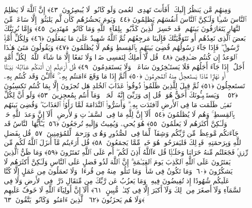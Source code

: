  وَمِنهُم مَّن يَنظُرُ إِلَيكَ ۚ أَفَأَنتَ تَهدِى ٱلعُمىَ وَلَو كَانُوا۟ لَا يُبصِرُونَ ﴿٤٣﴾
 إِنَّ ٱللَّهَ لَا يَظلِمُ ٱلنَّاسَ شَيـًۭٔا وَلَـٰكِنَّ ٱلنَّاسَ أَنفُسَهُم يَظلِمُونَ ﴿٤٤﴾
 وَيَومَ يَحشُرُهُم كَأَن لَّم يَلبَثُوٓا۟ إِلَّا سَاعَةًۭ مِّنَ ٱلنَّهَارِ يَتَعَارَفُونَ بَينَهُم ۚ قَد خَسِرَ ٱلَّذِينَ كَذَّبُوا۟ بِلِقَآءِ ٱللَّهِ وَمَا كَانُوا۟ مُهتَدِينَ ﴿٤٥﴾
 وَإِمَّا نُرِيَنَّكَ بَعضَ ٱلَّذِى نَعِدُهُم أَو نَتَوَفَّيَنَّكَ فَإِلَينَا مَرجِعُهُم ثُمَّ ٱللَّهُ شَهِيدٌ عَلَىٰ مَا يَفعَلُونَ ﴿٤٦﴾
 وَلِكُلِّ أُمَّةٍۢ رَّسُولٌۭ ۖ فَإِذَا جَآءَ رَسُولُهُم قُضِىَ بَينَهُم بِٱلقِسطِ وَهُم لَا يُظلَمُونَ ﴿٤٧﴾
 وَيَقُولُونَ مَتَىٰ هَـٰذَا ٱلوَعدُ إِن كُنتُم صَـٰدِقِينَ ﴿٤٨﴾
 قُل لَّآ أَملِكُ لِنَفسِى ضَرًّۭا وَلَا نَفعًا إِلَّا مَا شَآءَ ٱللَّهُ ۗ لِكُلِّ أُمَّةٍ أَجَلٌ ۚ إِذَا جَآءَ أَجَلُهُم فَلَا يَستَـٔخِرُونَ سَاعَةًۭ ۖ وَلَا يَستَقدِمُونَ ﴿٤٩﴾
 قُل أَرَءَيتُم إِن أَتَىٰكُم عَذَابُهُۥ بَيَـٰتًا أَو نَهَارًۭا مَّاذَا يَستَعجِلُ مِنهُ ٱلمُجرِمُونَ ﴿٥٠﴾
 أَثُمَّ إِذَا مَا وَقَعَ ءَامَنتُم بِهِۦٓ ۚ ءَآلـَٰٔنَ وَقَد كُنتُم بِهِۦ تَستَعجِلُونَ ﴿٥١﴾
 ثُمَّ قِيلَ لِلَّذِينَ ظَلَمُوا۟ ذُوقُوا۟ عَذَابَ ٱلخُلدِ هَل تُجزَونَ إِلَّا بِمَا كُنتُم تَكسِبُونَ ﴿٥٢﴾
 ۞ وَيَستَنۢبِـُٔونَكَ أَحَقٌّ هُوَ ۖ قُل إِى وَرَبِّىٓ إِنَّهُۥ لَحَقٌّۭ ۖ وَمَآ أَنتُم بِمُعجِزِينَ ﴿٥٣﴾
 وَلَو أَنَّ لِكُلِّ نَفسٍۢ ظَلَمَت مَا فِى ٱلأَرضِ لَٱفتَدَت بِهِۦ ۗ وَأَسَرُّوا۟ ٱلنَّدَامَةَ لَمَّا رَأَوُا۟ ٱلعَذَابَ ۖ وَقُضِىَ بَينَهُم بِٱلقِسطِ ۚ وَهُم لَا يُظلَمُونَ ﴿٥٤﴾
 أَلَآ إِنَّ لِلَّهِ مَا فِى ٱلسَّمَـٰوَٟتِ وَٱلأَرضِ ۗ أَلَآ إِنَّ وَعدَ ٱللَّهِ حَقٌّۭ وَلَـٰكِنَّ أَكثَرَهُم لَا يَعلَمُونَ ﴿٥٥﴾
 هُوَ يُحىِۦ وَيُمِيتُ وَإِلَيهِ تُرجَعُونَ ﴿٥٦﴾
 يَـٰٓأَيُّهَا ٱلنَّاسُ قَد جَآءَتكُم مَّوعِظَةٌۭ مِّن رَّبِّكُم وَشِفَآءٌۭ لِّمَا فِى ٱلصُّدُورِ وَهُدًۭى وَرَحمَةٌۭ لِّلمُؤمِنِينَ ﴿٥٧﴾
 قُل بِفَضلِ ٱللَّهِ وَبِرَحمَتِهِۦ فَبِذَٟلِكَ فَليَفرَحُوا۟ هُوَ خَيرٌۭ مِّمَّا يَجمَعُونَ ﴿٥٨﴾
 قُل أَرَءَيتُم مَّآ أَنزَلَ ٱللَّهُ لَكُم مِّن رِّزقٍۢ فَجَعَلتُم مِّنهُ حَرَامًۭا وَحَلَـٰلًۭا قُل ءَآللَّهُ أَذِنَ لَكُم ۖ أَم عَلَى ٱللَّهِ تَفتَرُونَ ﴿٥٩﴾
 وَمَا ظَنُّ ٱلَّذِينَ يَفتَرُونَ عَلَى ٱللَّهِ ٱلكَذِبَ يَومَ ٱلقِيَـٰمَةِ ۗ إِنَّ ٱللَّهَ لَذُو فَضلٍ عَلَى ٱلنَّاسِ وَلَـٰكِنَّ أَكثَرَهُم لَا يَشكُرُونَ ﴿٦٠﴾
 وَمَا تَكُونُ فِى شَأنٍۢ وَمَا تَتلُوا۟ مِنهُ مِن قُرءَانٍۢ وَلَا تَعمَلُونَ مِن عَمَلٍ إِلَّا كُنَّا عَلَيكُم شُهُودًا إِذ تُفِيضُونَ فِيهِ ۚ وَمَا يَعزُبُ عَن رَّبِّكَ مِن مِّثقَالِ ذَرَّةٍۢ فِى ٱلأَرضِ وَلَا فِى ٱلسَّمَآءِ وَلَآ أَصغَرَ مِن ذَٟلِكَ وَلَآ أَكبَرَ إِلَّا فِى كِتَـٰبٍۢ مُّبِينٍ ﴿٦١﴾
 أَلَآ إِنَّ أَولِيَآءَ ٱللَّهِ لَا خَوفٌ عَلَيهِم وَلَا هُم يَحزَنُونَ ﴿٦٢﴾
 ٱلَّذِينَ ءَامَنُوا۟ وَكَانُوا۟ يَتَّقُونَ ﴿٦٣﴾
